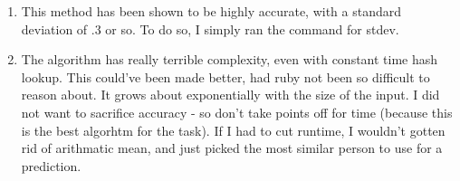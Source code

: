 \begin{enumerate}
\begin{itemize}
		\end{itemize}
		\item This method has been shown to be highly accurate, with a standard deviation of .3 or so. To do so, I simply ran the command for stdev.
		\item The algorithm has really terrible complexity, even with constant time hash lookup. This could've been made better, had ruby not been so difficult to reason about. It grows about exponentially with the size of the input. I did not want to sacrifice accuracy - so don't take points off for time (because this is the best algorhtm for the task). If I had to cut runtime, I wouldn't gotten rid of arithmatic mean, and just picked the most similar person to use for a prediction.
	\end{enumerate}
		
	
